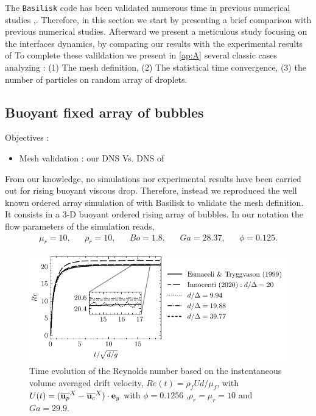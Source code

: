 

The \texttt{Basilisk} code has been validated numerous time in previous numerical studies \citet{innocenti2020direct},\citet{popinet2018numerical}. 
Therefore,  in this section we start by presenting a brief comparison with previous numerical studies. 
Afterward we present a meticulous study focusing on the interfaces dynamics, by comparing our results with the experimental results of \citet{mohamed2003drop} 
To complete these valildation we present in \ref{ap:A} several classic cases analyzing :
(1) The mesh definition, (2) The statistical time convergence, (3) the number of particles on random array of droplets. 
 
\subsection{Buoyant fixed array of bubbles}
Objectives :
\begin{itemize}
    \item Mesh validation : our DNS Vs. DNS of \cite{esmaeeli1999direct}
\end{itemize}
From our knowledge, no simulations nor experimental results have been carried out for rising buoyant viscous drop. 
Therefore, instead we reproduced the well known ordered array simulation of \citet{esmaeeli1999direct} with Basilisk to validate the mesh definition.  
It consists in a 3-D buoyant ordered rising array of bubbles. 
In our notation the flow parameters of the simulation reads, 
\begin{align*}
    \mu_r = 10,
    && \rho_r = 10,
    && Bo = 1.8,
    && Ga = 28.37,
    && \phi = 0.125.
\end{align*}
\begin{figure}[h!]
    \centering
    \includegraphics[height = 0.35\textwidth]{image/VALIDATION2.0/Loisy/Re.pdf}
    \caption{Time evolution of the Reynolds number based on the instentaneous volume averaged drift velocity, $Re(t) = \rho_fU d /\mu_f$, with $U(t) = (\overline{\textbf{u}_p}^X - \overline{\textbf{u}_c}^X)\cdot \textbf{e}_y$ with $\phi = 0.1256$ ,$\rho_r =\mu_r =10$ and $Ga = 29.9$.}
    \label{fig:ordered_array}
\end{figure}
